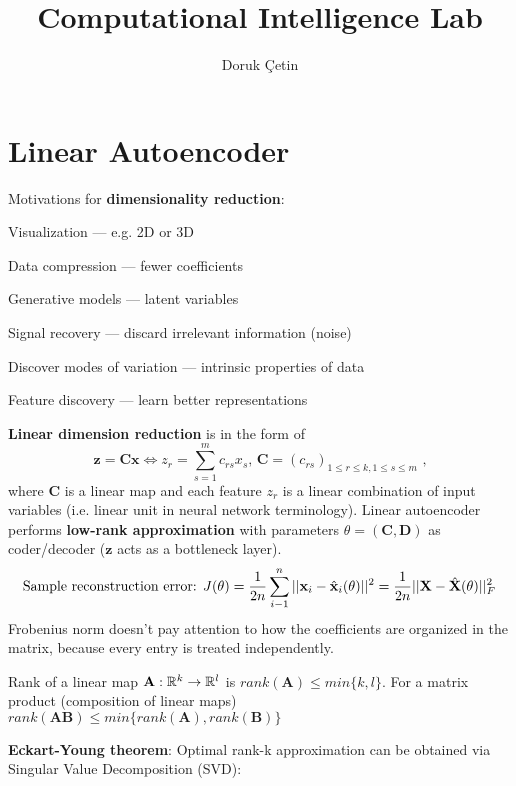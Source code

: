 \documentclass[12pt]{article}
\begin{document}
\rhead{\today}

\title{Computational Intelligence Lab}
\author{Doruk Çetin}
\maketitle

\tableofcontents
\pagebreak

\section{Linear Autoencoder}

Motivations for \textbf{dimensionality reduction}:
\ulb
\item Visualization --- e.g. 2D or 3D
\item Data compression --- fewer coefficients
\item Generative models --- latent variables
\item Signal recovery --- discard irrelevant information (noise)
\item Discover modes of variation --- intrinsic properties of data
\item Feature discovery --- learn better representations
\ule
\mce
\par \textbf{Linear dimension reduction} is in the form of \[ \mathbf{z} = \mathbf{C}\mathbf{x} \iff z_r = \sum^m_{s=1} c_{rs}x_s \text{, } \mathbf{C} = (c_{rs})_{1 \leq r\leq k, 1\leq s \leq m} \text{ ,} \]
where $\mathbf{C}$ is a linear map and each feature $z_r$ is a linear combination of input variables (i.e. linear unit in neural network terminology). Linear autoencoder performs \textbf{low-rank approximation} with parameters $\theta = (\mathbf{C,D})$ as coder/decoder ($\mathbf{z}$ acts as a bottleneck layer).
\[ \text{Sample reconstruction error: } J(\theta) = \frac{1}{2n} \sum_{i-1}^n ||\mathbf{x}_i - \hat{\mathbf{x}}_i(\theta)||^2 = \frac{1}{2n} ||\mathbf{X} - \hat{\mathbf{X}}(\theta)||^2_F \]
Frobenius norm doesn't pay attention to how the coefficients are organized in the matrix, because every entry is treated independently.
\par Rank of a linear map $ \mathbf{A}:\mathbb{R}^k \rightarrow \mathbb{R}^l $ is $ rank(\mathbf{A})\leq min\{k,l\} $. For a matrix product (composition of linear maps) $ rank(\mathbf{AB})\leq min\{rank(\mathbf{A}), rank(\mathbf{B})\} $
\par \textbf{Eckart-Young theorem}: Optimal rank-k approximation can be obtained via Singular Value Decomposition (SVD):
\end{document}
